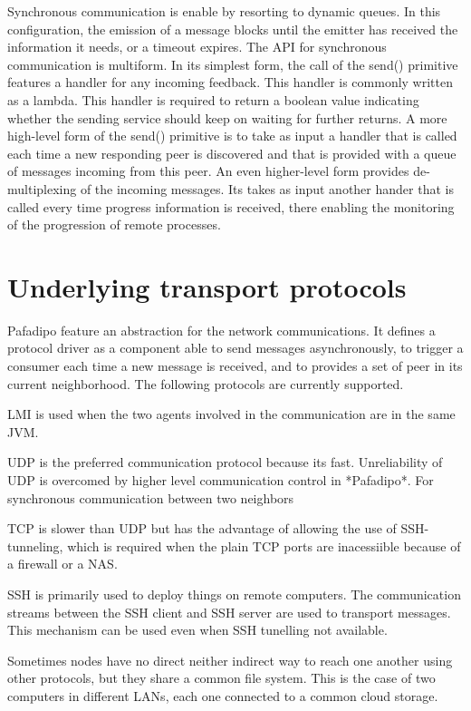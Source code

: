 \documentclass{article}
\begin{document}
Synchronous communication is enable by  resorting to dynamic queues.
In this configuration, the emission of a message blocks until the emitter has received the information it needs, or a timeout expires. The API for synchronous communication is multiform. In its simplest form, the call of the send() primitive features a handler for any incoming feedback. This handler is commonly written as a lambda. This handler  is required to return a boolean value indicating whether the sending service should keep on waiting for further returns. A more high-level form of the send() primitive is to take as input a handler that is called each time a new responding peer is discovered and that is provided with a queue of messages incoming from this peer.
An even higher-level form provides de-multiplexing of the incoming messages. Its takes as input another hander that is called every time progress information is received, there enabling the monitoring of the progression of remote processes.

\section{Underlying transport protocols}
Pafadipo feature an abstraction for the network communications. It defines a protocol driver as a component able to send messages asynchronously, to trigger a consumer each time a new message is received, and to provides a set of peer in its current neighborhood.
The following protocols are currently supported.

LMI is used when the two agents involved in the communication are in the same JVM.

UDP
is the preferred communication protocol because its fast.
Unreliability of UDP is overcomed by higher level communication control in *Pafadipo*.
For synchronous communication between two neighbors

TCP
is slower than UDP but has the advantage of allowing the use of SSH-tunneling, which is required when the plain TCP ports are inacessiible because of a firewall or a NAS.

SSH
is primarily used to deploy things on remote computers. The communication streams between the SSH client and SSH server are used to transport messages. This mechanism can be used even when SSH tunelling not available.

Sometimes nodes have no direct neither indirect way to reach one another using other protocols, but they share a common file system. This is the case of two computers in different LANs, each one connected to a common cloud storage.
\end{document}
